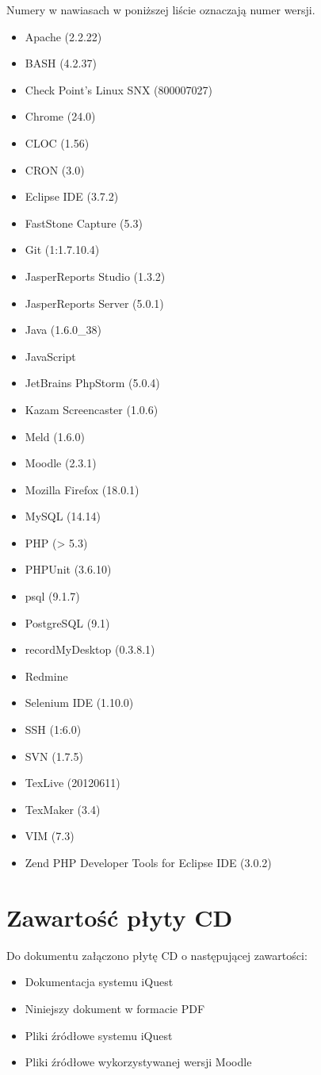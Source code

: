 Numery w nawiasach w poniższej liście oznaczają numer wersji.

\begin{itemize}
\item Apache (2.2.22)
\item BASH (4.2.37)
\item Check Point's Linux SNX (800007027)
\item Chrome (24.0)
\item CLOC (1.56)
\item CRON (3.0)
\item Eclipse IDE (3.7.2)
\item FastStone Capture (5.3)
\item Git (1:1.7.10.4)
\item JasperReports Studio (1.3.2)
\item JasperReports Server (5.0.1)
\item Java (1.6.0\_38)
\item JavaScript
\item JetBrains PhpStorm (5.0.4)
\item Kazam Screencaster (1.0.6)
\item Meld (1.6.0)
\item Moodle (2.3.1)
\item Mozilla Firefox (18.0.1)
\item MySQL (14.14)
\item PHP (> 5.3)
\item PHPUnit (3.6.10)
\item psql (9.1.7)
\item PostgreSQL (9.1)
\item recordMyDesktop (0.3.8.1)
\item Redmine
\item Selenium IDE (1.10.0)
\item SSH (1:6.0)
\item SVN (1.7.5)
\item TexLive (20120611)
\item TexMaker (3.4)
\item VIM (7.3)
\item Zend PHP Developer Tools for Eclipse IDE (3.0.2)
\end{itemize}

\section{Zawartość płyty CD}

Do dokumentu załączono płytę CD o następującej zawartości:

\begin{itemize}
\item Dokumentacja systemu iQuest
\item Niniejszy dokument w formacie PDF
\item Pliki źródłowe systemu iQuest
\item Pliki źródłowe wykorzystywanej wersji Moodle
\end{itemize}